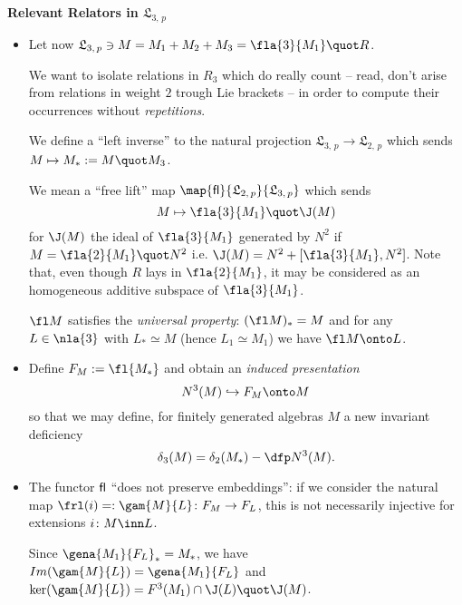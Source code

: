 \documentclass[a4paper,11pt,german,english]{report}
\newcommand{\nl}[1]{\mathfrak{L}_{#1,\,p}}
\begin{document}
\indent
{\bf Relevant Relators in $\mathfrak{L}_{3,\,p}$}
\begin{itemize}
\item[]Let now $\mathfrak{L}_{3,\,p}\ni M=M_{1}+M_{2}+M_{3}=\fla{3}{M_{1}}\quot R$.

We want to isolate relations in $R_{3}$ which do really count -- read, don't arise from
relations in weight $2$ trough Lie brackets -- in order to compute their occurrences without
{\em repetitions}.

We define a ``left inverse'' to the natural
projection $\nl{3}\to\nl{2}$ which sends $M\mapsto M_{*}:=M\quot M_{3}$.

We mean a ``free lift'' map $\map{{\sf fl}}{\mathfrak{L}_{2,\,p}}{\mathfrak{L}_{3,\,p}}$ which sends
$$M\mapsto\fla{3}{M_{1}}\quot\J(M)$$ for $\J(M)$
the ideal of $\fla{3}{M_{1}}$ generated by
$N^{2}$ if $M=\fla{2}{M_{1}}\quot N^{2}$ i.{}e. $\J(M)=N^{2}+[\fla{3}{M_{1}},N^{2}]$.
Note that, even though $R$ lays in $\fla{2}{M_{1}}$, it may be
considered as an homogeneous additive subspace of $\fla{3}{M_{1}}$.

$\fl M$ satisfies the {\em universal property}: $(\fl M)_{*}=M$ and for any
$L\in\nla{3}$ with $L_{*}\simeq M$ (hence $L_{1}\simeq M_{1}$) we have
$\fl M\onto L$.

\item[]Define $F_{M}:=\fl {M_{*}}$ and obtain an
{\em induced presentation}
$$N^{3}(M)\hookrightarrow F_{M}\onto M$$
so that we may define,
for finitely generated algebras $M$ a new invariant deficiency
$$\delta_{3}(M)=\delta_{2}(M_{*})-\dfp N^{3}(M).$$


\item[]The functor ${\sf fl}$ ``does not preserve embeddings'': if we consider the natural map
$\frl(i)=:\gam{M}{L}\colon F_{M}\to F_{L}$, this is not necessarily injective
for extensions $i\colon M\inn L$.%

Since ${\gena{M_{1}}{F_{L}}}_{*}=M_{*}$, we have $Im(\gam{M}{L})=\gena{M_{1}}{F_{L}}$ and $\ker(\gam{M}{L})=F^{3}(M_{1})\cap
\J(L)\quot\J(M)$.


\end{itemize}
\end{document}
